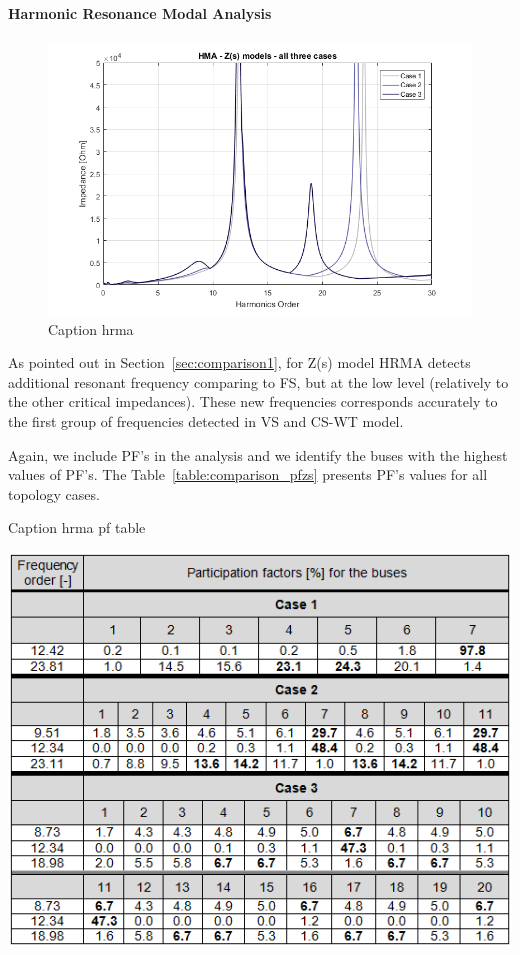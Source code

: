 \documentclass[12pt]{report} %
\begin{document}
\paragraph{Harmonic Resonance Modal Analysis}
\begin{figure}[htb]
	\centering
	\includegraphics[width=1\textwidth]{img/Case123/HRMA_Zs.png}
	\caption{Caption hrma}
  	\label{fig:comparison_hrmazs}
\end{figure}
\FloatBarrier

As pointed out in Section~\ref{sec:comparison1}, for Z(s) model HRMA detects additional resonant frequency comparing to FS, but at the low level (relatively to the other critical impedances). These new frequencies corresponds accurately to the first group of frequencies detected in VS and CS-WT model.

Again, we include PF’s in the analysis and we identify the buses with the highest values of PF’s. The Table~\ref{table:comparison_pfzs} presents PF’s values for all topology cases.

\begin{table}[htb]
	\centering
	\caption{Caption hrma pf table}
	\includegraphics[width=1\textwidth]{img/Case123/PF_Zs_table.png}
  	\label{table:comparison_pfzs}
\end{table}
\FloatBarrier
\end{document}
